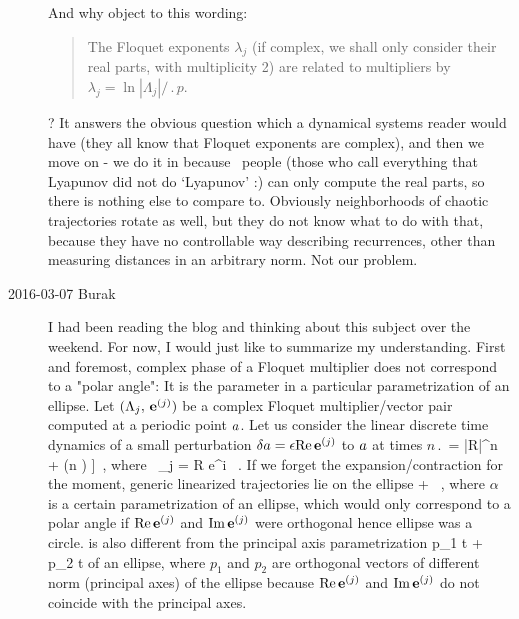 \begin{description}
{And why object to this wording:

\begin{quote}
The Floquet exponents $\lambda_j$
(if complex, we shall only consider their real parts, with multiplicity 2)
are related to multipliers by $\lambda_j=\ln|\Lambda_j|/\period{p}$.
\end{quote}

? It answers the obvious question which a dynamical systems reader would
have (they all know that Floquet exponents are complex), and then we move
on - we do it in  because \cLv\ people (those who call
everything that Lyapunov did not do `Lyapunov' :) can only compute the
real parts, so there is nothing else to compare to. Obviously
neighborhoods of chaotic trajectories rotate as well, but they do not
know what to do with that, because they have no controllable way
describing recurrences, other than measuring distances in an arbitrary
norm. Not our problem.
    }


\item[2016-03-07 Burak] I had been reading the blog and thinking
about this subject over the weekend. For now, I would just like to
summarize my understanding. First and foremost, complex phase of a
Floquet multiplier does not correspond to a "polar angle": It is the
parameter in a particular parametrization of an ellipse. Let
$(\ExpaEig_{j},\, \jEigvec[j])$ be a complex Floquet multiplier/vector
pair computed at a periodic point $\ssp$. Let us consider the linear
discrete time dynamics of a small perturbation
$\delta \ssp = \epsilon \Re \jEigvec[j]$ to $\ssp$ at times
$n \period{}$
\beq
    \delta \ssp [n] = \epsilon |R|^n
    \left[\cos (n \Omega) \Re \jEigvec[j]
         + \sin (n \Omega) \Im \jEigvec[j] \right] \,,
         \mbox{where } \ExpaEig_{j} = R e^{i \Omega} \, .
    \label{e-DiscreteDynamics}
\eeq
If we forget the expansion/contraction for the moment, generic
linearized trajectories lie on the ellipse
\beq
    \Re \jEigvec[j] \cos \alpha
         + \Im \jEigvec[j] \sin \alpha  \, ,
\label{e-FloquetEllipse}
\eeq
where $\alpha$ is a certain parametrization of an ellipse, which would
only correspond to a polar angle if $\Re \jEigvec[j]$ and
$\Im \jEigvec[j]$ were orthogonal hence ellipse was a circle.
 is also different from the principal axis
parametrization
\beq
    p_1 \cos t  + p_2 \sin t
    \label{e-pAxesEllipse}
\eeq
of an ellipse, where $p_1$ and $p_2$ are orthogonal vectors of different
norm (principal axes) of the ellipse because
$\Re \jEigvec[j]$ and $\Im \jEigvec[j]$ do not coincide with the
principal axes.


\end{description}
